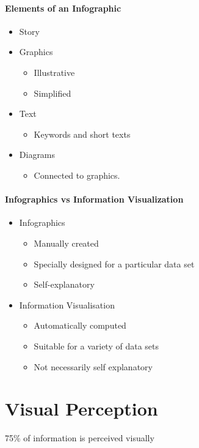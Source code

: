 \documentclass[10pt,a4paper]{article}
\begin{document}
	\paragraph{Elements of an Infographic}
	\begin{itemize}
		\item Story
		\item Graphics
		\begin{itemize}
			\item Illustrative
			\item Simplified
		\end{itemize}
		\item Text
		\begin{itemize}
			\item Keywords and short texts
		\end{itemize}
		\item Diagrams
		\begin{itemize}
			\item Connected to graphics.
		\end{itemize}
	\end{itemize}

	\paragraph{Infographics vs Information Visualization}
	\begin{itemize}
		\item Infographics 
		\begin{itemize}
			\item Manually created
			\item Specially designed for a particular data set
			\item Self-explanatory
		\end{itemize}
		\item Information Visualisation
		\begin{itemize}
			\item Automatically computed
			\item Suitable for a variety of data sets
			\item Not necessarily self explanatory
		\end{itemize}
	\end{itemize}
	

\section{Visual Perception}
	75\% of information is perceived visually
\end{document}
